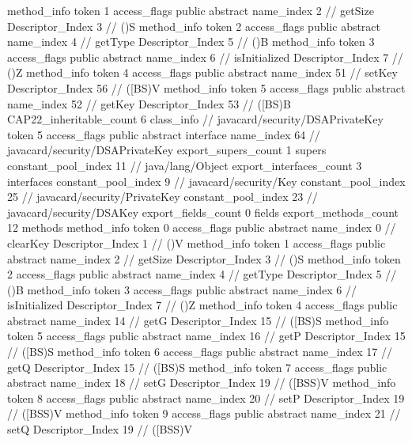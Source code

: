 {{{{				method_info {
					token	1
					access_flags	public abstract
					name_index	2		// getSize
					Descriptor_Index	3		// ()S
				}
				method_info {
					token	2
					access_flags	public abstract
					name_index	4		// getType
					Descriptor_Index	5		// ()B
				}
				method_info {
					token	3
					access_flags	public abstract
					name_index	6		// isInitialized
					Descriptor_Index	7		// ()Z
				}
				method_info {
					token	4
					access_flags	public abstract
					name_index	51		// setKey
					Descriptor_Index	56		// ([BS)V
				}
				method_info {
					token	5
					access_flags	public abstract
					name_index	52		// getKey
					Descriptor_Index	53		// ([BS)B
				}
			}
			CAP22_inheritable_count	6
		}
		class_info {		// javacard/security/DSAPrivateKey
			token	5
			access_flags	public abstract interface
			name_index	64		// javacard/security/DSAPrivateKey
			export_supers_count	1
			supers {
				constant_pool_index	11		// java/lang/Object
			}
			export_interfaces_count	3
			interfaces {
				constant_pool_index	9		// javacard/security/Key
				constant_pool_index	25		// javacard/security/PrivateKey
				constant_pool_index	23		// javacard/security/DSAKey
			}
			export_fields_count	0
			fields {
			}
			export_methods_count	12
			methods {
				method_info {
					token	0
					access_flags	public abstract
					name_index	0		// clearKey
					Descriptor_Index	1		// ()V
				}
				method_info {
					token	1
					access_flags	public abstract
					name_index	2		// getSize
					Descriptor_Index	3		// ()S
				}
				method_info {
					token	2
					access_flags	public abstract
					name_index	4		// getType
					Descriptor_Index	5		// ()B
				}
				method_info {
					token	3
					access_flags	public abstract
					name_index	6		// isInitialized
					Descriptor_Index	7		// ()Z
				}
				method_info {
					token	4
					access_flags	public abstract
					name_index	14		// getG
					Descriptor_Index	15		// ([BS)S
				}
				method_info {
					token	5
					access_flags	public abstract
					name_index	16		// getP
					Descriptor_Index	15		// ([BS)S
				}
				method_info {
					token	6
					access_flags	public abstract
					name_index	17		// getQ
					Descriptor_Index	15		// ([BS)S
				}
				method_info {
					token	7
					access_flags	public abstract
					name_index	18		// setG
					Descriptor_Index	19		// ([BSS)V
				}
				method_info {
					token	8
					access_flags	public abstract
					name_index	20		// setP
					Descriptor_Index	19		// ([BSS)V
				}
				method_info {
					token	9
					access_flags	public abstract
					name_index	21		// setQ
					Descriptor_Index	19		// ([BSS)V
}}}}}
